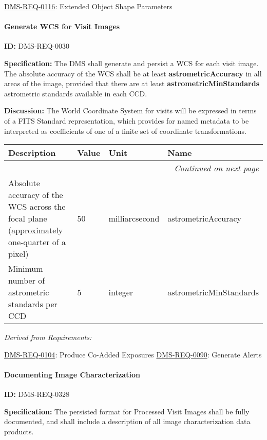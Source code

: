 \documentclass[SE,toc,lsstdraft]{lsstdoc}
\makeatletter
\newcommand{\paramname}[1]{\hspace{0pt}#1}
\newcommand{\unitname}[1]{\hspace{0pt}#1}
\newenvironment{parameters}[0]{%
\setlength\LTleft{0pt}
\setlength\LTright{\fill}
\begin{small}
\begin{longtable}[]{|p{0.5\textwidth}|l|p{0.6in}|p{1.74in}@{}|}

\hline \textbf{Description} & \textbf{Value} & \textbf{Unit} & \textbf{Name} \\ \hline
\endhead

\hline \multicolumn{4}{r}{\emph{Continued on next page}} \\
\endfoot

\hline\hline
\endlastfoot
}{%
\hline
\end{longtable}
\end{small}
}
\makeatother
\begin{document}
\hyperref[DMS-REQ-0116]{DMS-REQ-0116}:
Extended Object Shape Parameters \newline


\paragraph{Generate WCS for Visit Images}\hfill  %

\label{DMS-REQ-0030}
\textbf{ID:} DMS-REQ-0030

\textbf{Specification:} The DMS shall generate and persist a WCS for each visit image.  The absolute accuracy of the WCS shall be at least \textbf{astrometricAccuracy} in all areas of the image, provided that there are at least \textbf{astrometricMinStandards} astrometric standards available in each CCD.

\textbf{Discussion:} The World Coordinate System for visits will be expressed in terms of a FITS Standard representation, which provides for named metadata to be interpreted as coefficients of one of a finite set of coordinate transformations.



\begin{parameters}
Absolute accuracy of the WCS across the focal plane (approximately one-quarter of a pixel)
&
50
&
\unitname{%
milliarcsecond
}
&
\paramname{%
astrometricAccuracy
} \\\hline
Minimum number of astrometric standards per CCD
&
5
&
\unitname{%
integer
}
&
\paramname{%
astrometricMinStandards
} \\\hline
\end{parameters}




\emph{Derived from Requirements:}

\hyperref[DMS-REQ-0104]{DMS-REQ-0104}:
Produce Co-Added Exposures \newline
\hyperref[DMS-REQ-0090]{DMS-REQ-0090}:
Generate Alerts \newline


\paragraph{Documenting Image Characterization}\hfill  %

\label{DMS-REQ-0328}
\textbf{ID:} DMS-REQ-0328

\textbf{Specification:} The persisted format for Processed Visit Images shall be fully documented, and shall include a description of all image characterization data products.
\end{document}
